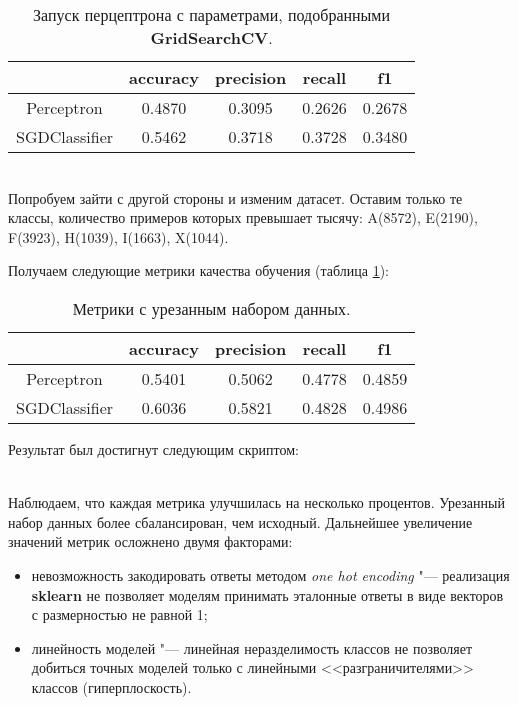 \begin{table}[!h]
	\centering
	\begin{tabular}{|c|c|c|c|c|}
		\hline
		& \textbf{accuracy} & \textbf{precision} & \textbf{recall} & \textbf{f1} \\\hline
		Perceptron       & 0.4870 & 0.3095 & 0.2626 & 0.2678 \\\hline
		SGDClassifier    & 0.5462 & 0.3718 & 0.3728 & 0.3480 \\\hline
	\end{tabular}
	\caption{Запуск перцептрона с параметрами, подобранными \textbf{GridSearchCV}.}
\end{table}

\noindent{}\\

Попробуем зайти с другой стороны и изменим датасет. Оставим только те классы, количество примеров которых превышает тысячу: A(8572), E(2190), F(3923), H(1039), I(1663), X(1044). 

Получаем следующие метрики качества обучения (таблица \ref{tbl:squeezed_dataset}):
\begin{table}[!h]
	\centering
	\begin{tabular}{|c|c|c|c|c|}
		\hline
		& \textbf{accuracy} & \textbf{precision} & \textbf{recall} & \textbf{f1} \\\hline
		Perceptron       & 0.5401 & 0.5062 & 0.4778 & 0.4859 \\\hline
		SGDClassifier    & 0.6036 & 0.5821 & 0.4828 & 0.4986 \\\hline
	\end{tabular}
	\caption{Метрики с урезанным набором данных.}
	\label{tbl:squeezed_dataset}
\end{table}

Результат был достигнут следующим скриптом:

\noindent{}\\

Наблюдаем, что каждая метрика улучшилась на несколько процентов. Урезанный набор данных более сбалансирован, чем исходный. Дальнейшее увеличение значений метрик осложнено двумя факторами:
\begin{itemize}
	\item невозможность закодировать ответы методом \textit{one hot encoding} "--- реализация \textbf{sklearn} не позволяет моделям принимать эталонные ответы в виде векторов с размерностью не равной 1;
	\item линейность моделей "--- линейная неразделимость классов не позволяет добиться точных моделей только с линейными <<разграничителями>> классов (гиперплоскость).
\end{itemize}